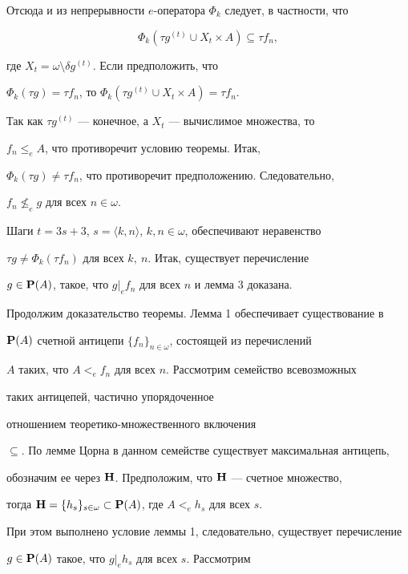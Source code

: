 Отсюда и из непрерывности $e$-оператора $\Phi_k$ следует, в частности, что


$$


\Phi_k(\tau g^{(t)}\cup X_t\times A)\subseteq\tau f_n,


$$


где $X_t=\omega\setminus\delta g^{(t)}$. Если предположить, что


$\Phi_k(\tau g)=\tau f_n$, то $\Phi_k(\tau g^{(t)}\cup X_t\times A)=\tau f_n$.


Так как $\tau g^{(t)}$ --- конечное, а $X_t$ --- вычислимое множества, то


$f_n\leq_eA$, что противоречит условию теоремы. Итак,


$\Phi_k(\tau g)\neq\tau f_n$, что противоречит предположению. Следовательно,


$f_n\not\leq_eg$ для всех $n\in\omega$.





Шаги $t=3s+3$, $s=\langle k,n\rangle$, $k,n\in\omega$, обеспечивают неравенство


$\tau g\neq\Phi_k(\tau f_n)$ для всех $k,\ n$. Итак, существует перечисление


$g\in{\bold P}(A)$, такое, что $g|_ef_n$ для всех $n$ и лемма 3 доказана.





Продолжим доказательство теоремы. Лемма 1 обеспечивает существование в


${\bold P}(A)$ счетной антицепи $\{f_n\}_{n\in\omega}$, состоящей из перечислений


$A$ таких, что $A<_ef_n$ для всех $n$. Рассмотрим семейство всевозможных


таких антицепей, частично упорядоченное 


отношением теоретико-мно\-же\-ст\-вен\-ного включения


$\subseteq$. По лемме Цорна в данном семействе существует максимальная антицепь,


обозначим ее через ${\bold H}$. Предположим, что ${\bold H}$ --- счетное множество,


тогда ${\bold H}=\{h_s\}_{s\in\omega}\subset{\bold P}(A)$, где $A<_eh_s$ для всех $s$.


При этом выполнено условие леммы 1, следовательно, существует перечисление


$g\in{\bold P}(A)$ такое, что $g|_eh_s$ для всех $s$. Рассмотрим


